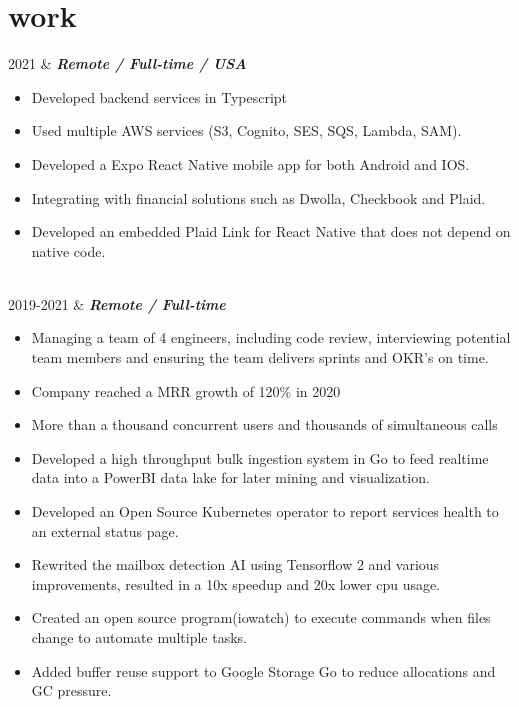 \documentclass[]{cv-mauri}
\begin{document}
\section*{work}
\begin{tabularcv}
	2021   &   
					\textbf{\textit{Remote / Full-time / USA}}

			\begin{itemize}
				\item Developed backend services in Typescript
				\item Used multiple AWS services (S3, Cognito, SES, SQS, Lambda, SAM).
				\item Developed a Expo React Native mobile app for both Android and IOS.
				\item Integrating with financial solutions such as Dwolla, Checkbook and Plaid.
				\item  Developed an embedded Plaid Link for React Native that does not depend on native code.
			\end{itemize}
					\\[\vspacepar]
	
    2019-2021   &   
                    \textbf{\textit{Remote / Full-time}}
            \begin{itemize}
            	\item Managing a team of 4 engineers, including code review, interviewing potential team members and ensuring the team delivers sprints and OKR's on time.
            	\item Company reached a MRR growth of 120\% in 2020
            	\item More than a thousand concurrent users and thousands of simultaneous calls
            	\item Developed a high throughput bulk ingestion system in Go to feed realtime data into a PowerBI data lake for later mining and visualization.
            	\item Developed an Open Source Kubernetes operator to report services health to an external status page.
            	\item Rewrited the mailbox detection AI using Tensorflow 2 and various improvements, resulted in a 10x speedup and 20x lower cpu usage.
            	\item Created an open source program(iowatch) to execute commands when files change to automate multiple tasks.
            	\item Added buffer reuse support to Google Storage Go to reduce allocations and GC pressure.
            \end{itemize}
                    \\[\vspacepar]


\end{tabularcv}
\end{document}
